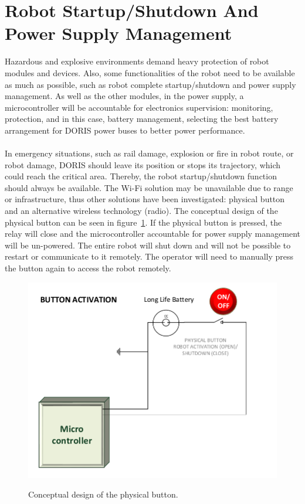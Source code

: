 \section{Robot Startup/Shutdown And Power Supply Management}
Hazardous and explosive environments demand heavy protection of robot modules and devices.  Also, some functionalities of the robot need to be available as much as possible, such as robot complete startup/shutdown and power supply management. As well as the other modules, in the power supply, a microcontroller will be accountable for electronics supervision: monitoring, protection, and in this case, battery management, selecting the best battery arrangement for DORIS power buses to better power performance.\\
\\
In emergency situations, such as rail damage, explosion or fire in robot route, or robot damage, DORIS should leave its position or stops its trajectory, which could reach the critical area. Thereby, the robot startup/shutdown function should always be available. The Wi-Fi solution may be unavailable due to range or infrastructure, thus other solutions have been investigated: physical button and an alternative wireless technology (radio).
The conceptual design of the physical button can be seen in figure~\ref{FIG:SUPCIRPS2}. If the physical button is pressed, the relay will close and the microcontroller accountable for power supply management will be un-powered. The entire robot will shut down and will not be possible to restart or communicate to it remotely. The operator will need to manually press the button again to access the robot remotely.
\begin{figure}
  \centering
  \includegraphics[width=1\columnwidth]{figs/tables/geralblockPS2.pdf}\\
  \caption[Conceptual design of the physical button]{Conceptual design of the physical button.}
  \label{FIG:SUPCIRPS2}
\end{figure}
